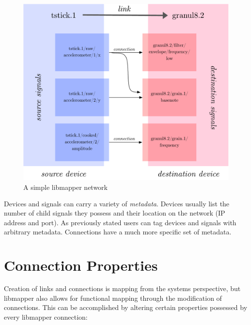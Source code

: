 \begin{figure}[!ht]
\centering
	\includegraphics[width=\textwidth]{figures/libmapper_devices}
\caption{A simple libmapper network}
\label{fig:libmapper_devices}
\end{figure}

Devices and signals can carry a variety of \emph{metadata}. Devices usually list the number of child signals they possess and their location on the network (IP address and port). As previously stated users can tag devices and signals with arbitrary metadata. Connections have a much more specific set of metadata.


	\section{Connection Properties} %
	\label{sec:connection_properties}

Creation of links and connections is mapping from the systems perspective, but libmapper also allows for functional mapping through the modification of connections. This can be accomplished by altering certain properties possessed by every libmapper connection:

